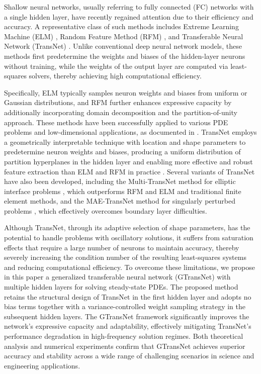 \documentclass{article}
\begin{document}
Shallow neural networks, usually referring to fully connected (FC) networks with a single hidden layer, have recently regained attention due to their efficiency and accuracy. A representative class of such methods includes Extreme Learning Machine (ELM) \cite{ELM}, Random Feature Method (RFM) \cite{RFM}, and Transferable Neural Network (TransNet) \cite{TransNet}. Unlike conventional deep neural network models, these methods first predetermine the weights and biases of the hidden-layer neurons without training, while the weights of the output layer are computed via least-squares solvers, thereby achieving high computational efficiency.

Specifically, ELM typically samples neuron weights and biases from uniform or Gaussian distributions, and RFM further enhances expressive capacity by additionally incorporating domain decomposition and the partition-of-unity approach. These methods have been successfully applied to various PDE problems and low-dimensional applications, as documented in \cite{CHENJinrun25,Dong2021,DONG2021110585,ELIADEFALCO2026114553,Wangfei2024, ChenJingrun2025, Dong2024, Jingrun2025, weakTransNet}. TransNet employs a geometrically interpretable technique with location and shape parameters to predetermine neuron weights and biases, producing a uniform distribution of partition hyperplanes in the hidden layer and enabling more effective and robust feature extraction than ELM and RFM in practice \cite{TransNet}.
Several variants of TransNet have also been developed, including the Multi-TransNet method for elliptic interface problems \cite{Lu25}, which outperforms RFM \cite{Chi24} and ELM \cite{Liang25} and traditional finite element methods, and the MAE-TransNet method for singularly perturbed problems \cite{Shen2025}, which effectively overcomes boundary layer difficulties.

Although TransNet, through its adaptive selection of shape parameters, has the potential to handle problems with oscillatory solutions, it suffers from saturation effects that require a large number of neurons to maintain accuracy, thereby severely increasing the condition number of the resulting least-squares systems and reducing computational efficiency. To overcome these limitations, we propose in this paper a generalized transferable neural network (GTransNet) with multiple hidden layers for solving steady-state PDEs. The proposed method retains the structural design of TransNet in the first hidden layer and adopts no bias terms together with a variance-controlled weight sampling strategy in the subsequent hidden layers. The GTransNet framework significantly improves the network’s expressive capacity and adaptability, effectively mitigating TransNet’s performance degradation in high-frequency solution regimes. Both theoretical analysis and numerical experiments confirm that GTransNet achieves superior accuracy and stability across a wide range of challenging scenarios in science and engineering applications.
\end{document}
